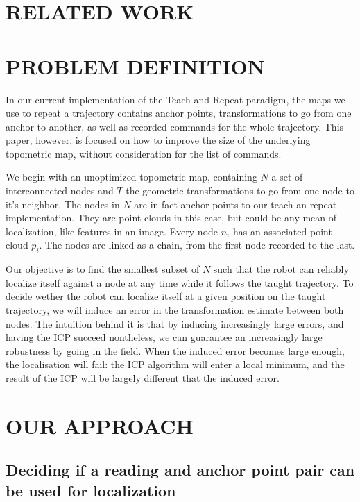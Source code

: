 \documentclass[letterpaper,10 pt,conference]{ieeeconf}
\begin{document}
\section{RELATED WORK}


\section{PROBLEM DEFINITION}

In our current implementation of the Teach and Repeat paradigm, the maps we use to repeat a
trajectory contains anchor points, transformations to go from one anchor to another, as well as
recorded commands for the whole trajectory. This paper, however, is focused on how to improve the
size of the underlying topometric map, without consideration for the list of commands.

We begin with an unoptimized topometric map, containing $N$ a set of interconnected nodes and $T$
the geometric transformations to go from one node to it's neighbor. The nodes in $N$ are in fact
anchor points to our teach an repeat implementation. They are point clouds in this case, but could
be any mean of localization, like features in an image. Every node $n_i$ has an associated point
cloud $p_i$. The nodes are linked as a chain, from the first node recorded to the last.

Our objective is to find the smallest subset of $N$ such that the robot can reliably localize itself
against a node at any time while it follows the taught trajectory. To decide wether the robot can
localize itself at a given position on the taught trajectory, we will induce an error in the
transformation estimate between both nodes. The intuition behind it is that by inducing increasingly
large errors, and having the ICP succeed nontheless, we can guarantee an increasingly large
robustness by going in the field. When the induced error becomes large enough, the localisation will
fail: the ICP algorithm will enter a local minimum, and the result of the ICP will be largely
different that the induced error.

\section{OUR APPROACH}
\label{approach}

\subsection{Deciding if a reading and anchor point pair can be used for localization}
\label{approach-deciding-converge}
\end{document}
